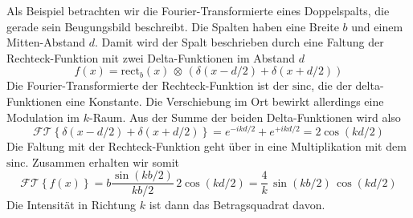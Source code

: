 Als Beispiel betrachten wir die Fourier-Transformierte eines Doppelspalts, die gerade sein Beugungsbild beschreibt. Die Spalten haben eine Breite $b$ und einem Mitten-Abstand $d$. Damit wird der Spalt beschrieben durch eine Faltung der Rechteck-Funktion mit zwei Delta-Funktionen im Abstand $d$
\begin{equation}
f(x) = \text{rect} _b (x) \, \otimes \, \left( \delta (x - d/2) + \delta (x + d/2) \right)
\end{equation}
Die Fourier-Transformierte der Rechteck-Funktion ist der $\text{sinc}$, die der delta-Funktionen eine Konstante. Die Verschiebung im Ort bewirkt allerdings eine Modulation im $k$-Raum. Aus der Summe der beiden Delta-Funktionen wird also 
\begin{equation}
\mathcal{FT}\left\{ \delta (x - d/2) + \delta (x + d/2)  \right\} =
e^{-i k d/2} + e^{+i k d/2}  = 2 \cos ( k d/2)
\end{equation}
Die Faltung mit der Rechteck-Funktion geht über in eine Multiplikation mit dem $\text{sinc}$. Zusammen erhalten wir somit
\begin{equation}
\mathcal{FT}\left\{ f(x)  \right\} = b \frac{\sin (k b/2) }{kb/2} \, 2 \cos ( k d/2) = \frac{4}{k} \, \sin (k b/2) \,  \cos ( k d/2) 
\end{equation}
Die Intensität in Richtung $k$ ist dann das Betragsquadrat davon.

\printbibliography[segment=\therefsegment,heading=subbibliography]
